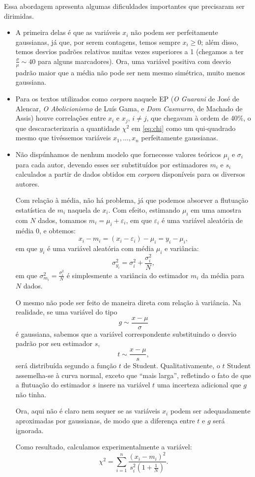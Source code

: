 \documentclass[10pt,a4paper,onecolumn]{article}
\theoremstyle{definition}
\theoremstyle{remark}
\begin{document}
Essa abordagem apresenta algumas dificuldades importantes que precisaram ser dirimidas. 
\begin{itemize}
	\item A primeira delas é que as variáveis $x_i$ não podem ser perfeitamente gaussianas, já que, por serem contagens, temos sempre $x_i \geqslant 0$; além disso, temos desvios padrões relativos muitas vezes superiores a 1 (chegamos a ter $\frac{\sigma}{\mu} \sim 40$ para alguns marcadores). Ora, uma variável positiva com desvio padrão maior que a média não pode ser nem mesmo simétrica, muito menos gaussiana.
	\item Para os textos utilizados como \emph{corpora} naquele EP (\emph{O Guarani} de José de Alencar, \emph{O Abolicionismo} de Luís Gama, e \emph{Dom Casmurro}, de Machado de Assis) houve correlações entre $x_i$ e $x_j$, $i \neq j$, que chegavam à ordem de 40\%, o que descaracterizaria a quantidade $\chi^2$ em \eqref{eq:chi} como um qui-quadrado mesmo que tivéssemos variáveis $x_1,\dots,x_n$ perfeitamente gaussianas.
	\item Não dispúnhamos de nenhum modelo que fornecesse valores teóricos $\mu_i$ e $\sigma_i$ para cada autor, devendo esses ser substituídos por estimadores $m_i$ e $s_i$ calculados a partir de dados obtidos em \emph{corpora} disponíveis para os diversos autores.
	
	 Com relação à média, não há problema, já que podemos absorver a flutuação estatística de $m_i$ naquela de $x_i$. Com efeito, estimando $\mu_i$ em uma amostra com $N$ dados, tomamos $m_i = \mu_i + \varepsilon_i$, em que $\varepsilon_i$ é uma variável aleatória de média $0$, e obtemos:
	$$x_i - m_i = (x_i - \varepsilon_i) - \mu_i = y_i - \mu_i,$$
	em que $y_i$ é uma variável aleatória com média $\mu_i$ e variância:
	$$\sigma^2_{y_i} = \sigma_i^2 + \frac{\sigma_i^2}{N},$$
	em que $\sigma^2_{m_i} = \frac{\sigma_i^2}{N}$ é simplesmente a variância do estimador $m_i$ da média para $N$ dados. 
	
	O mesmo não pode ser feito de maneira direta com relação à variância. Na realidade, se uma variável do tipo 
	$$g \sim \frac{x-\mu}{\sigma}$$
	é gaussiana, sabemos que a variável correspondente substituindo o desvio padrão por seu estimador $s$,
	$$t \sim \frac{x-\mu}{s},$$
	será distribuída segundo a função $t$ de Student. Qualitativamente, o $t$ Student assemelha-se à curva normal, exceto que ``mais larga'', refletindo o fato de que a flutuação do estimador $s$ insere na variável $t$ uma incerteza adicional que $g$ não tinha.
	
	Ora, aqui não é claro nem sequer se as variáveis $x_i$ podem ser adequadamente aproximadas por gaussianas, de modo que a diferença entre $t$ e $g$ será ignorada.
	
	Como resultado, calculamos experimentalmente a variável:
	\begin{equation}\label{eq:meuqui}
		\chi^2 = \sum_{i = 1}^n \frac{(x_i-m_i)^2}{s_i^2\left(1 + \frac{1}{N}\right)}.
	\end{equation}
\end{itemize}
\end{document}
